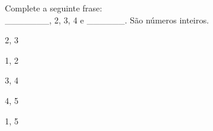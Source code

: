 \question[10]
Complete a seguinte frase:\\
_______, 2, 3, 4 e ______. São números inteiros.
\\
\begin{choices}
\item 2, 3
\item 1, 2 
\item 3, 4 
\item 4, 5 
\item 1, 5 %
\end{choices}
\answerline
